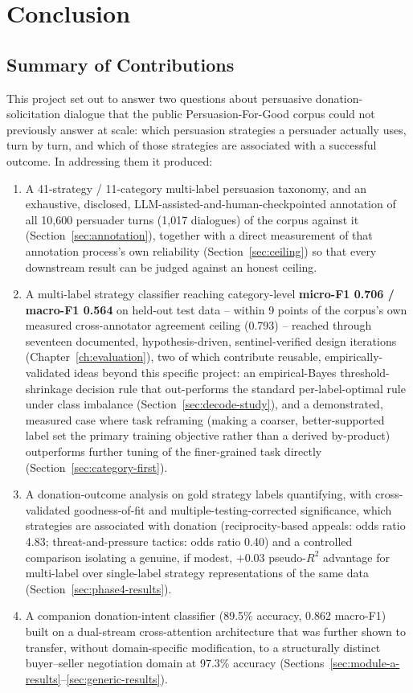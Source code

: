 \chapter{Conclusion}
\label{ch:conclusion}

\section{Summary of Contributions}

This project set out to answer two questions about persuasive
donation-solicitation dialogue that the public Persuasion-For-Good corpus
could not previously answer at scale: which persuasion strategies a
persuader actually uses, turn by turn, and which of those strategies are
associated with a successful outcome. In addressing them it produced:

\begin{enumerate}
\item A 41-strategy / 11-category multi-label persuasion taxonomy, and an
  exhaustive, disclosed, LLM-assisted-and-human-checkpointed annotation of
  all 10{,}600 persuader turns (1{,}017 dialogues) of the corpus against it
  (Section~\ref{sec:annotation}), together with a direct measurement of that
  annotation process's own reliability (Section~\ref{sec:ceiling}) so that
  every downstream result can be judged against an honest ceiling.
\item A multi-label strategy classifier reaching category-level
  \textbf{micro-F1 0.706 / macro-F1 0.564} on held-out test data -- within
  9 points of the corpus's own measured cross-annotator agreement ceiling
  (0.793) -- reached through seventeen documented, hypothesis-driven,
  sentinel-verified design iterations (Chapter~\ref{ch:evaluation}), two of
  which contribute reusable, empirically-validated ideas beyond this
  specific project: an empirical-Bayes threshold-shrinkage decision rule
  that out-performs the standard per-label-optimal rule under class
  imbalance (Section~\ref{sec:decode-study}), and a demonstrated,
  measured case where task reframing (making a coarser, better-supported
  label set the primary training objective rather than a derived
  by-product) outperforms further tuning of the finer-grained task directly
  (Section~\ref{sec:category-first}).
\item A donation-outcome analysis on gold strategy labels quantifying, with
  cross-validated goodness-of-fit and multiple-testing-corrected
  significance, which strategies are associated with donation
  (reciprocity-based appeals: odds ratio 4.83; threat-and-pressure tactics:
  odds ratio 0.40) and a controlled comparison isolating a genuine, if
  modest, $+0.03$ pseudo-$R^2$ advantage for multi-label over single-label
  strategy representations of the same data (Section~\ref{sec:phase4-results}).
\item A companion donation-intent classifier (89.5\% accuracy, 0.862
  macro-F1) built on a dual-stream cross-attention architecture that was
  further shown to transfer, without domain-specific modification, to a
  structurally distinct buyer--seller negotiation domain at 97.3\% accuracy
  (Sections~\ref{sec:module-a-results}--\ref{sec:generic-results}).
\end{enumerate}

